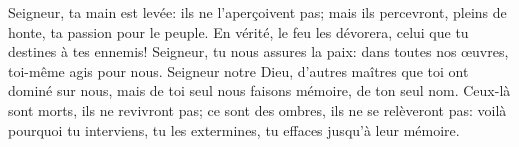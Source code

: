 Seigneur, ta main est levée: ils ne l’aperçoivent pas;
	mais ils percevront, pleins de honte, ta passion pour le peuple.
En vérité, le feu les dévorera,
	celui que tu destines à tes ennemis!
Seigneur, tu nous assures la paix:
	dans toutes nos œuvres, toi-même agis pour nous.
Seigneur notre Dieu, d’autres maîtres que toi ont dominé sur nous,
	mais de toi seul nous faisons mémoire, de ton seul nom.
Ceux-là sont morts, ils ne revivront pas;
	ce sont des ombres, ils ne se relèveront pas:
	voilà pourquoi tu interviens,
	tu les extermines, tu effaces jusqu’à leur mémoire.
